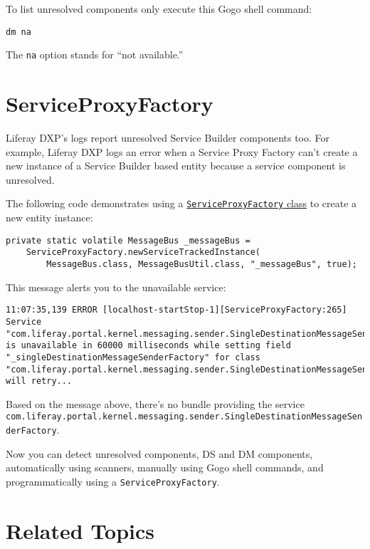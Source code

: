 To list unresolved components only execute this Gogo shell command:

\begin{verbatim}
dm na
\end{verbatim}

The \texttt{na} option stands for ``not available.''

\section{ServiceProxyFactory}\label{serviceproxyfactory}

Liferay DXP's logs report unresolved Service Builder components too. For
example, Liferay DXP logs an error when a Service Proxy Factory can't
create a new instance of a Service Builder based entity because a
service component is unresolved.

The following code demonstrates using a
\href{https://docs.liferay.com/dxp/portal/7.2-latest/javadocs/portal-kernel/com/liferay/portal/kernel/util/ServiceProxyFactory.html}{\texttt{ServiceProxyFactory}
class} to create a new entity instance:

\begin{verbatim}
private static volatile MessageBus _messageBus =
    ServiceProxyFactory.newServiceTrackedInstance(
        MessageBus.class, MessageBusUtil.class, "_messageBus", true);
\end{verbatim}

This message alerts you to the unavailable service:

\begin{verbatim}
11:07:35,139 ERROR [localhost-startStop-1][ServiceProxyFactory:265] Service "com.liferay.portal.kernel.messaging.sender.SingleDestinationMessageSenderFactory" is unavailable in 60000 milliseconds while setting field "_singleDestinationMessageSenderFactory" for class "com.liferay.portal.kernel.messaging.sender.SingleDestinationMessageSenderFactoryUtil", will retry...
\end{verbatim}

Based on the message above, there's no bundle providing the service
\texttt{com.liferay.portal.kernel.messaging.sender.SingleDestinationMessageSenderFactory}.

Now you can detect unresolved components, DS and DM components,
automatically using scanners, manually using Gogo shell commands, and
programmatically using a \texttt{ServiceProxyFactory}.

\section{Related Topics}\label{related-topics-31}

